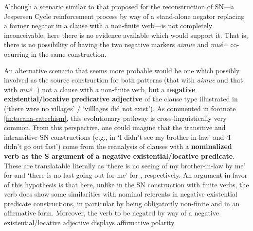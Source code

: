 \documentclass[output=paper]{langsci/langscibook}
\begin{document}
Although a scenario similar to that proposed for the reconstruction of
SN---a Jespersen Cycle reinforcement process by way of a stand-alone
negator replacing a former negator in a clause with a non-finite verb---is
not completely inconceivable, here there is no evidence available which
would support it. That is, there is no possibility of having the two
negative markers \textit{aimue} and \textit{mué=} co-ocurring in the same
construction.

An alternative scenario that seems more probable would be one
which possibly involved as the source construction for both patterns (that
with \textit{aimue} and that with \textit{mué=}) not a clause with a
non-finite verb, but a \textbf{negative existential\slash locative
predicative adjective} of the clause type illustrated in
 (`there were no villages' / `villlages did not
exist'). As commented in footnote \ref{fn:tacana-catechism}, this evolutionary
pathway is cross-linguistically very common. From this perspective, one
could imagine that the transitive and intransitive SN constructions (e.g.,
in  `I didn't see my brother-in-law' and
 `I didn't go out fast') come from the reanalysis
of clauses with a \textbf{nominalized verb as the S argument of a negative
existential\slash locative predicate}. These are translatable literally as `there is
no seeing of my brother-in-law by me' for  and
`there is no fast going out for me' for ,
respectively. An argument in favor of this hypothesis is that here, unlike
in the SN construction with finite verbs, the verb does show some
similarities with nominal referents in negative existential predicate
constructions, in particular by being obligatorily non-finite and in an
affirmative form. Moreover, the verb to be negated by way of a negative
existential\slash locative adjective displays affirmative polarity.
\end{document}
